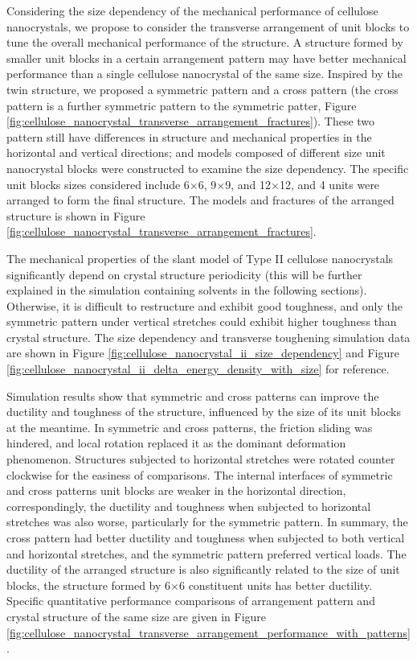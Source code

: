 \documentclass{article}
\begin{document}
Considering the size dependency of the mechanical performance of cellulose nanocrystals, we propose to consider the transverse arrangement of unit blocks to tune the overall mechanical performance of the structure.
A structure formed by smaller unit blocks in a certain arrangement pattern may have better mechanical performance than a single cellulose nanocrystal of the same size.
Inspired by the twin structure, we proposed a symmetric pattern and a cross pattern (the cross pattern is a further symmetric pattern to the symmetric patter, Figure \ref{fig:cellulose_nanocrystal_transverse_arrangement_fractures}).
These two pattern still have differences in structure and mechanical properties in the horizontal and vertical directions;
and models composed of different size unit nanocrystal blocks were constructed to examine the size dependency.
The specific unit blocks sizes considered include 6$\times$6, 9$\times$9, and 12$\times$12, and 4 units were arranged to form the final structure.
The models and fractures of the arranged structure is shown in Figure \ref{fig:cellulose_nanocrystal_transverse_arrangement_fractures}.

The mechanical properties of the slant model of Type II cellulose nanocrystals significantly depend on crystal structure periodicity (this will be further explained in the simulation containing solvents in the following sections).
Otherwise, it is difficult to restructure and exhibit good toughness, and only the symmetric pattern under vertical stretches could exhibit higher toughness than crystal structure.
The size dependency and transverse toughening simulation data are shown in Figure \ref{fig:cellulose_nanocrystal_ii_size_dependency} and Figure \ref{fig:cellulose_nanocrystal_ii_delta_energy_density_with_size} for reference.

Simulation results show that symmetric and cross patterns can improve the ductility and toughness of the structure, influenced by the size of its unit blocks at the meantime.
In symmetric and cross patterns, the friction sliding was hindered, and local rotation replaced it as the dominant deformation phenomenon.
Structures subjected to horizontal stretches were rotated counter clockwise for the easiness of comparisons.
The internal interfaces of symmetric and cross patterns unit blocks are weaker in the horizontal direction, correspondingly, the ductility and toughness when subjected to  horizontal stretches was also worse, particularly for the symmetric pattern.
In summary, the cross pattern had better ductility and toughness when subjected to both vertical and horizontal stretches, and the symmetric pattern preferred vertical loads.
The ductility of the arranged structure is also significantly related to the size of unit blocks, the structure formed by 6$\times$6 constituent units has better ductility.
Specific quantitative performance comparisons of arrangement pattern and crystal structure of the same size are given in Figure \ref{fig:cellulose_nanocrystal_transverse_arrangement_performance_with_patterns}.
\end{document}

